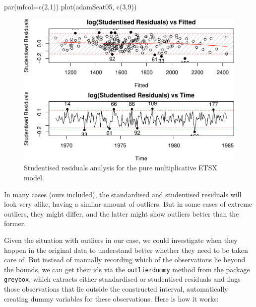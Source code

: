 \documentclass[
]{book}
\newenvironment{Shaded}{\begin{snugshade}}{\end{snugshade}}
\newcommand{\AttributeTok}[1]{\textcolor[rgb]{0.77,0.63,0.00}{#1}}
\newcommand{\DecValTok}[1]{\textcolor[rgb]{0.00,0.00,0.81}{#1}}
\newcommand{\FunctionTok}[1]{\textcolor[rgb]{0.00,0.00,0.00}{#1}}
\newcommand{\NormalTok}[1]{#1}
\theoremstyle{definition}
\theoremstyle{definition}
\theoremstyle{definition}
\theoremstyle{definition}
\theoremstyle{remark}
\begin{document}
\begin{Shaded}
\begin{Highlighting}[]
\FunctionTok{par}\NormalTok{(}\AttributeTok{mfcol=}\FunctionTok{c}\NormalTok{(}\DecValTok{2}\NormalTok{,}\DecValTok{1}\NormalTok{))}
\FunctionTok{plot}\NormalTok{(adamSeat05, }\FunctionTok{c}\NormalTok{(}\DecValTok{3}\NormalTok{,}\DecValTok{9}\NormalTok{))}
\end{Highlighting}
\end{Shaded}

\begin{figure}
\centering
\includegraphics{Svetunkov--2022----ADAM_files/figure-latex/adamSeat05Student-1.pdf}
\caption{\label{fig:adamSeat05Student}Studentised residuals analysis for the pure multiplicative ETSX model.}
\end{figure}

In many cases (ours included), the standardised and studentised residuals will look very alike, having a similar amount of outliers. But in some cases of extreme outliers, they might differ, and the latter might show outliers better than the former.

Given the situation with outliers in our case, we could investigate when they happen in the original data to understand better whether they need to be taken care of. But instead of manually recording which of the observations lie beyond the bounds, we can get their ids via the \texttt{outlierdummy} method from the package \texttt{greybox}, which extracts either standardised or studentised residuals and flags those observations that lie outside the constructed interval, automatically creating dummy variables for these observations. Here is how it works:
\end{document}
